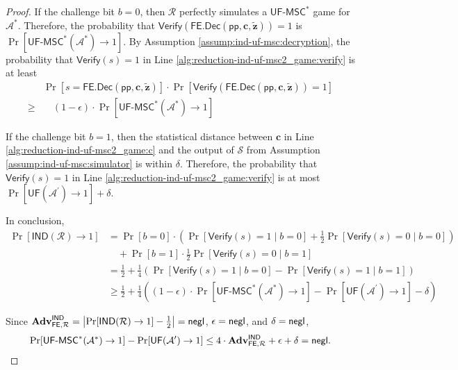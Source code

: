 \begin{proof}
If the challenge bit $b = 0$, then $\mathcal{R}$ perfectly simulates a $\textsf{UF-MSC}^*$ game for $\mathcal{A}^*$. Therefore, the probability that $\textsf{Verify}(\textsf{FE.Dec}(\textsf{pp}, \mathbf{c}, \mathbf{\tilde{z}})) = 1$ is $\Pr[\textsf{UF-MSC}^*(\mathcal{A}^*) \to 1]$. By Assumption \ref{assump:ind-uf-msc:decryption}, the probability that $\textsf{Verify}(s) = 1$ in Line \ref{alg:reduction-ind-uf-msc2_game:verify} is at least
\begin{align*}
	& \Pr \left[ s = \textsf{FE.Dec}(\textsf{pp}, \mathbf{c}, \mathbf{\tilde{z}}) \right]  \cdot \Pr \left[ \textsf{Verify}(\textsf{FE.Dec}(\textsf{pp}, \mathbf{c}, \mathbf{\tilde{z}})) = 1 \right] \\
	\geq & \quad (1 - \epsilon) \cdot \Pr[\textsf{UF-MSC}^*(\mathcal{A}^*) \to 1]
\end{align*}

	If the challenge bit $b = 1$, then the statistical distance between $\mathbf{c}$ in Line \ref{alg:reduction-ind-uf-msc2_game:c} and the output of $\mathcal{S}$ from Assumption \ref{assump:ind-uf-msc:simulator} is within $\delta$. Therefore, the probability that $\textsf{Verify}(s) = 1$ in Line \ref{alg:reduction-ind-uf-msc2_game:verify} is at most $\Pr[\textsf{UF}(\mathcal{A}^\prime) \to 1] + \delta$.

In conclusion,
\begin{align*}
	\Pr[\textsf{IND}(\mathcal{R}) \to 1] 
	&= \Pr[b = 0] \cdot \left( \Pr[\textsf{Verify}(s) = 1 \mid b = 0] + \frac{1}{2} \Pr[\textsf{Verify}(s) = 0 \mid b = 0] \right) \\
	&\quad + \Pr[b = 1] \cdot \frac{1}{2} \Pr[\textsf{Verify}(s) = 0 \mid b = 1] \\
	&= \frac{1}{2} + \frac{1}{4} \left( \Pr[\textsf{Verify}(s) = 1 \mid b = 0] - \Pr[\textsf{Verify}(s) = 1 \mid b = 1] \right) \\
	&\geq \frac{1}{2} + \frac{1}{4} \left( (1-\epsilon) \cdot \Pr[\textsf{UF-MSC}^*(\mathcal{A}^*) \to 1] - \Pr[\textsf{UF}(\mathcal{A}^\prime) \to 1] - \delta \right)
\end{align*}

\noindent Since $\mathbf{Adv}_{\textsf{FE}, \mathcal{R}}^\textsf{IND} = \left| \Pr[\textsf{IND}(\mathcal{R}) \to 1] - \frac{1}{2} \right| = \mathsf{negl}$, $\epsilon = \mathsf{negl}$, and $\delta = \mathsf{negl}$,
\[
	\Pr[\textsf{UF-MSC}^*(\mathcal{A}^*) \to 1] - \Pr[\textsf{UF}(\mathcal{A}^\prime) \to 1] \leq 4 \cdot \mathbf{Adv}_{\textsf{FE}, \mathcal{R}}^\textsf{IND} + \epsilon + \delta = \mathsf{negl}.
\]

\end{proof}

